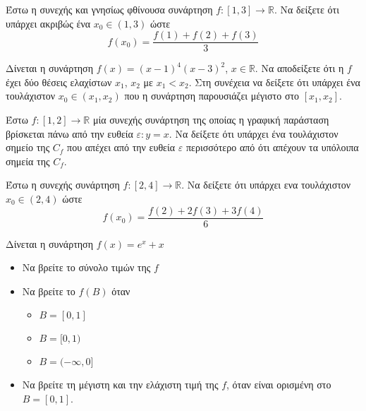 \documentclass{presentation}
\begin{document}
\begin{askisi}
  Έστω η συνεχής και γνησίως φθίνουσα συνάρτηση $f:[1,3]\to\mathbb{R}$. Να δείξετε ότι υπάρχει ακριβώς ένα $x_0\in (1,3)$ ώστε
  $$f(x_0)=\frac{f(1)+f(2)+f(3)}{3}$$

  \hyperlink{Λύση2}{}
\end{askisi}

\begin{askisi}
  Δίνεται η συνάρτηση $f(x)=(x-1)^4(x-3)^2$, $x\in \mathbb{R}$. Να αποδείξετε ότι η $f$ έχει δύο θέσεις ελαχίστων $x_1$, $x_2$ με $x_1<x_2$. Στη συνέχεια να δείξετε ότι υπάρχει ένα τουλάχιστον $x_0\in (x_1,x_2)$ που η συνάρτηση παρουσιάζει μέγιστο στο $[x_1,x_2]$.

  \hyperlink{Λύση3}{}
\end{askisi}

\begin{askisi}
  Έστω $f:[1,2]\to\mathbb{R}$ μία συνεχής συνάρτηση της οποίας η γραφική παράσταση βρίσκεται πάνω από την ευθεία $ε:y=x$. Να δείξετε ότι υπάρχει ένα τουλάχιστον σημείο της $C_f$ που απέχει από την ευθεία $ε$ περισσότερο από ότι απέχουν τα υπόλοιπα σημεία της $C_f$.

  \hyperlink{Λύση4}{}
\end{askisi}

\begin{askisi}
  Έστω η συνεχής συνάρτηση $f:[2,4]\to\mathbb{R}$. Να δείξετε ότι υπάρχει ενα τουλάχιστον $x_0\in (2,4)$ ώστε
  $$f(x_0)=\frac{f(2)+2f(3)+3f(4)}{6}$$

  \hyperlink{Λύση5}{}
\end{askisi}

\begin{askisi}
  Δίνεται η συνάρτηση $f(x)=e^x+x$
  \begin{itemize}
    \item<1-> Να βρείτε το σύνολο τιμών της $f$
    \item<2-> Να βρείτε το $f(Β)$ όταν
          \begin{itemize}
            \item<3-> $Β=[0,1]$
            \item<4-> $Β=[0,1)$
            \item<5-> $Β=(-\infty,0]$
          \end{itemize}
    \item<6-> Να βρείτε τη μέγιστη και την ελάχιστη τιμή της $f$, όταν είναι ορισμένη στο $Β=[0,1]$.
  \end{itemize}

  \hyperlink{Λύση6}{}
\end{askisi}
\end{document}

